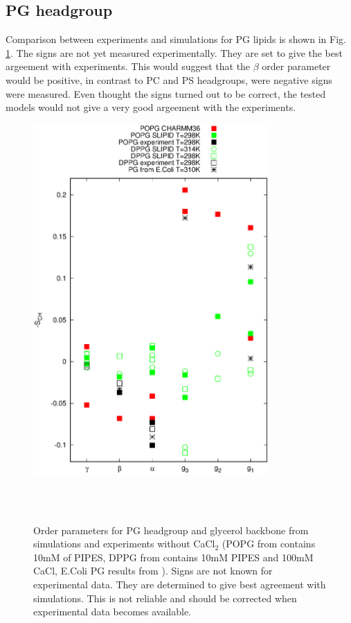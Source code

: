 \documentclass[aps,prl,superscriptaddress,twocolumn]{revtex4}
\begin{document}
\subsection{PG headgroup}
Comparison between experiments and simulations for PG lipids is shown
in Fig. \ref{HGorderParametersPOPG}. The signs are not yet measured
experimentally. They are set to give the best argeement with experiments.
This would suggest that the $\beta$ order parameter would be positive,
in contrast to PC and PS headgroups, were negative signs were measured.
Even thought the signs turned out to be correct, the tested models would
not give a very good argeement with the experiments.
\begin{figure}[]
  \centering
  \includegraphics[width=9.0cm]{../Figs/HGorderparametersPOPG.eps}
  \caption{\label{HGorderParametersPOPG}
    Order parameters for PG headgroup and glycerol backbone from simulations and experiments without CaCl$_2$ 
    (POPG from \cite{borle85} contains 10mM of PIPES, DPPG from \cite{wohlgemuth80} contains 10mM PIPES and 100mM CaCl,
    E.Coli PG results from \cite{gally81}).
    Signs are not known for experimental data. They are determined to give best agreement
    with simulations. This is not reliable and should be corrected when experimental
    data becomes available.
  }
   \\
   \\
\end{figure}
\end{document}
